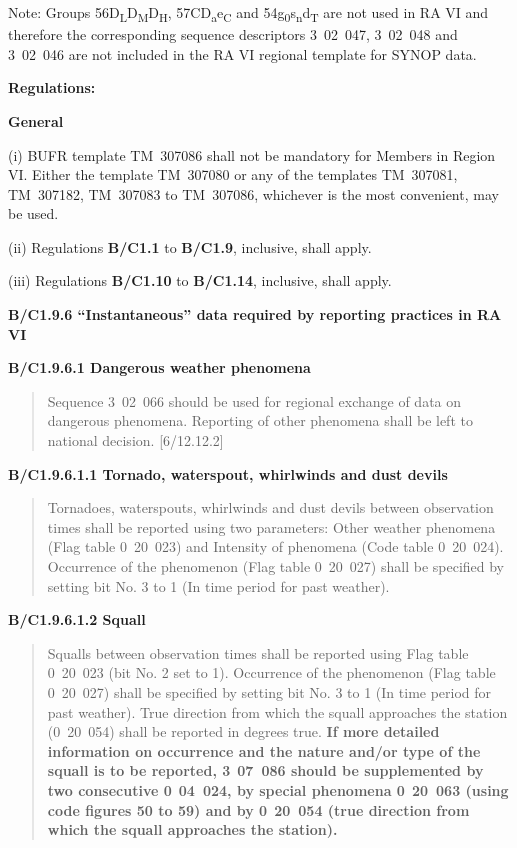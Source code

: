 Note: Groups 56D\textsubscript{L}D\textsubscript{M}D\textsubscript{H}, 57CD\textsubscript{a}e\textsubscript{C} and 54g\textsubscript{0}s\textsubscript{n}d\textsubscript{T} are not used in RA VI and therefore the corresponding sequence descriptors 3~02~047, 3~02~048 and 3~02~046 are not included in the RA VI regional template for SYNOP data.

\textbf{Regulations:}

\textbf{General}

(i) BUFR template TM~307086 shall not be mandatory for Members in Region VI. Either the template TM~307080 or any of the templates TM~307081, TM~307182, TM~307083 to TM~307086, whichever is the most convenient, may be used.

(ii) Regulations \textbf{B/C1.1} to \textbf{B/C1.9}, inclusive, shall apply.

(iii) Regulations \textbf{B/C1.10} to \textbf{B/C1.14}, inclusive, shall apply.

\textbf{B/C1.9.6 ``Instantaneous'' data required by reporting practices in RA VI}

\textbf{B/C1.9.6.1 Dangerous weather phenomena}

\begin{quote}
Sequence 3~02~066 should be used for regional exchange of data on dangerous phenomena. Reporting of other phenomena shall be left to national decision. {[}6/12.12.2{]}
\end{quote}

\textbf{B/C1.9.6.1.1 Tornado, waterspout, whirlwinds and dust devils}

\begin{quote}
Tornadoes, waterspouts, whirlwinds and dust devils between observation times shall be reported using two parameters: Other weather phenomena (Flag table 0~20~023) and Intensity of phenomena (Code table 0~20~024). Occurrence of the phenomenon (Flag table 0~20~027) shall be specified by setting bit No. 3 to 1 (In time period for past weather).
\end{quote}

\textbf{B/C1.9.6.1.2 Squall}

\begin{quote}
Squalls between observation times shall be reported using Flag table 0~20~023 (bit No. 2 set to 1). Occurrence of the phenomenon (Flag table 0~20~027) shall be specified by setting bit No. 3 to 1 (In time period for past weather). True direction from which the squall approaches the station (0~20~054) shall be reported in degrees true. \textbf{If more detailed information on occurrence and the nature and/or type of the squall is to be reported, 3}~\textbf{07~086 should be supplemented by two consecutive 0}~\textbf{04~024, by special phenomena 0}~\textbf{20~063 (using code figures 50 to 59) and by 0}~\textbf{20~054 (true direction from which the squall approaches the station).}
\end{quote}

